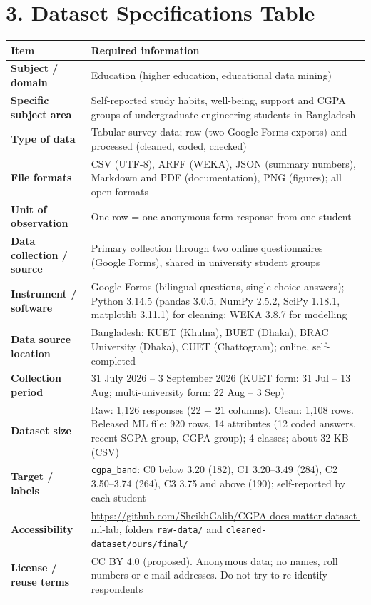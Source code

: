 \documentclass[11pt,a4paper]{article}
\newcommand{\hd}[1]{\textbf{#1}}
\begin{document}
\section{3. Dataset Specifications Table}
{\small
\begin{tabularx}{\linewidth}{|L{40mm}|Y|}
\hline
{}\hd{Item} & \hd{Required information} \\ \hline
\hd{Subject / domain} & Education (higher education, educational data mining) \\ \hline
\hd{Specific subject area} & Self-reported study habits, well-being, support and CGPA groups of undergraduate engineering students in Bangladesh \\ \hline
\hd{Type of data} & Tabular survey data; raw (two Google Forms exports) and processed (cleaned, coded, checked) \\ \hline
\hd{File formats} & CSV (UTF-8), ARFF (WEKA), JSON (summary numbers), Markdown and PDF (documentation), PNG (figures); all open formats \\ \hline
\hd{Unit of observation} & One row = one anonymous form response from one student \\ \hline
\hd{Data collection / source} & Primary collection through two online questionnaires (Google Forms), shared in university student groups \\ \hline
\hd{Instrument / software} & Google Forms (bilingual questions, single-choice answers); Python 3.14.5 (pandas 3.0.5, NumPy 2.5.2, SciPy 1.18.1, matplotlib 3.11.1) for cleaning; WEKA 3.8.7 for modelling \\ \hline
\hd{Data source location} & Bangladesh: KUET (Khulna), BUET (Dhaka), BRAC University (Dhaka), CUET (Chattogram); online, self-completed \\ \hline
\hd{Collection period} & 31 July 2026 -- 3 September 2026 (KUET form: 31 Jul -- 13 Aug; multi-university form: 22 Aug -- 3 Sep) \\ \hline
\hd{Dataset size} & Raw: 1,126 responses (22 + 21 columns). Clean: 1,108 rows. Released ML file: 920 rows, 14 attributes (12 coded answers, recent SGPA group, CGPA group); 4 classes; about 32 KB (CSV) \\ \hline
\hd{Target / labels} & \texttt{cgpa\_band}: C0 below 3.20 (182), C1 3.20--3.49 (284), C2 3.50--3.74 (264), C3 3.75 and above (190); self-reported by each student \\ \hline
\hd{Accessibility} & \url{https://github.com/SheikhGalib/CGPA-does-matter-dataset-ml-lab}, folders \texttt{raw-data/} and \texttt{cleaned-dataset/ours/final/} \\ \hline
\hd{License / reuse terms} & CC BY 4.0 (proposed). Anonymous data; no names, roll numbers or e-mail addresses. Do not try to re-identify respondents \\ \hline
\end{tabularx}}
\end{document}
